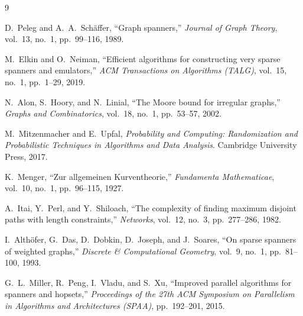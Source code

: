 \documentclass[11pt,a4paper]{article}
\begin{document}
\begin{thebibliography}{9}

D.~Peleg and A.~A.~Schäffer,
\newblock ``Graph spanners,''
\newblock \emph{Journal of Graph Theory}, vol.~13, no.~1, pp.~99--116, 1989.

M.~Elkin and O.~Neiman, 
\newblock ``Efficient algorithms for constructing very sparse spanners and emulators,'' 
\newblock \emph{ACM Transactions on Algorithms (TALG)}, vol.~15, no.~1, pp.~1--29, 2019.

N.~Alon, S.~Hoory, and N.~Linial, 
\newblock ``The Moore bound for irregular graphs,'' 
\newblock \emph{Graphs and Combinatorics}, vol.~18, no.~1, pp.~53--57, 2002.

M.~Mitzenmacher and E.~Upfal,
\newblock \emph{Probability and Computing: Randomization and Probabilistic Techniques in Algorithms and Data Analysis}.
\newblock Cambridge University Press, 2017.

K.~Menger,
\newblock ``Zur allgemeinen Kurventheorie,''
\newblock \emph{Fundamenta Mathematicae}, vol.~10, no.~1, pp.~96--115, 1927.

A.~Itai, Y.~Perl, and Y.~Shiloach, 
\newblock ``The complexity of finding maximum disjoint paths with length constraints,'' 
\newblock \emph{Networks}, vol.~12, no.~3, pp.~277--286, 1982.

I.~Althöfer, G.~Das, D.~Dobkin, D.~Joseph, and J.~Soares,
\newblock ``On sparse spanners of weighted graphs,''
\newblock \emph{Discrete \& Computational Geometry}, vol.~9, no.~1, pp.~81--100, 1993.

G.~L.~Miller, R.~Peng, I.~Vladu, and S.~Xu,
\newblock ``Improved parallel algorithms for spanners and hopsets,''
\newblock \emph{Proceedings of the 27th ACM Symposium on Parallelism in Algorithms and Architectures (SPAA)}, pp.~192--201, 2015.

\end{thebibliography}
\end{document}
